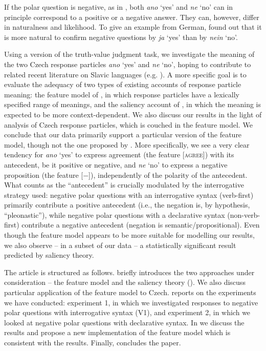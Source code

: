 \documentclass[output=paper,colorlinks,citecolor=brown]{langscibook}
\begin{document}
\noindent If the polar question is negative, as in , both \textit{ano} `yes' and \textit{ne} `no' can in principle correspond to a positive or a negative answer. They can, however, differ in naturalness and likelihood. To give an example from German, \citet{claus2017puzzling} found out that it is more natural to confirm negative questions by \textit{ja} `yes' than by \textit{nein} `no'.

Using a version of the truth-value judgment task, we investigate the meaning of the two Czech response particles \textit{ano} `yes' and \textit{ne} `no', hoping to contribute to related recent literature on Slavic languages (e.g. \citealt{gruet2016yes,esipova2021polar,Geist.Repp2023}). A more specific goal is to evaluate the adequacy of two types of existing accounts of response particle meaning: the feature model of \citet{roelofsen-farkas15}, in which response particles have a lexically specified range of meanings, and the saliency account of \citet{hrd+:krifka13}, in which the meaning is expected to be more context-dependent. We also discuss our results in the light of  analysis of Czech response particles, which is couched in the feature model. We conclude that our data primarily support a particular version of the feature model, though not the one proposed by \citet{gruet2016yes}. More specifically, we see a very clear tendency for \textit{ano} `yes' to express agreement (the feature [\textsc{agree}]) with its antecedent, be it positive or negative, and \textit{ne} `no' to express a negative proposition (the feature [$-$]), independently of the polarity of the antecedent. What counts as the ``antecedent'' is crucially modulated by the interrogative strategy used: negative polar questions with an interrogative syntax (verb-first) primarily contribute a positive antecedent (i.e., the negation is, by hypothesis, ``pleonastic''), while negative polar questions with a declarative syntax (non-verb-first) contribute a negative antecedent (negation is semantic/propositional). Even though the feature model appears to be more suitable for modelling our results, we also observe -- in a subset of our data -- a statistically significant result predicted by  saliency theory.

The article is structured as follows.  briefly introduces the two approaches under consideration -- the feature model \citep{roelofsen-farkas15} and the saliency theory (\citealt{hrd+:krifka13}). We also discuss  particular application of the feature model to Czech.  reports on the experiments we have conducted: experiment 1, in which we investigated responses to negative polar questions with interrogative syntax (V1), and experiment 2, in which we looked at negative polar questions with declarative syntax. In  we discuss the results and propose a new implementation of the feature model which is consistent with the results. Finally,  concludes the paper.
\end{document}
